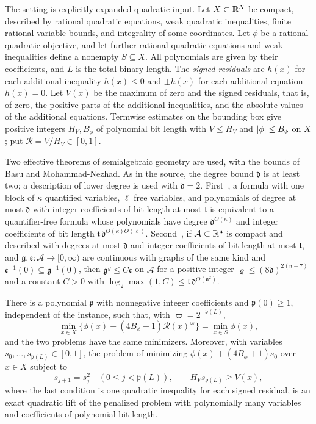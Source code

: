 The setting is explicitly expanded quadratic input. Let $X\subset\mathbb R^N$ be
compact, described by rational quadratic equations, weak quadratic
inequalities, finite rational variable bounds, and integrality of some
coordinates. Let $\phi$ be a rational quadratic objective, and let further
rational quadratic equations and weak inequalities define a nonempty
$S\subseteq X$. All polynomials are given by their coefficients, and $L$ is
the total binary length. The \emph{signed residuals} are $h(x)$ for each
additional inequality $h(x)\le0$ and $\pm h(x)$ for each additional equation
$h(x)=0$. Let $V(x)$ be the maximum of zero and the signed residuals, that
is, of zero, the positive parts of the additional inequalities, and the
absolute values of the additional equations. Termwise estimates on the
bounding box give positive
integers $H_V,B_\phi$ of polynomial bit length with $V\le H_V$ and
$\left\lvert\phi\right\rvert\le B_\phi$ on $X$; put $\mathcal R=V/H_V\in[0,1]$.

Two effective theorems of semialgebraic geometry are used, with the bounds
of Basu and Mohammad-Nezhad. As in the source, the degree bound $\mathfrak d$
is at least two; a description of lower degree is used with $\mathfrak d=2$.
First~\cite[Theorem~4.1]{BasuMohammadNezhad2024}, a formula with one block of
$\kappa$ quantified variables, $\ell$ free variables, and polynomials of
degree at most $\mathfrak d$ with integer coefficients of bit length at most
$\mathfrak t$ is equivalent to a quantifier-free formula whose polynomials
have degree $\mathfrak d^{O(\kappa)}$ and integer coefficients of bit length
$\mathfrak t\,\mathfrak d^{O(\kappa)O(\ell)}$.
Second~\cite[Theorem~2.2]{BasuMohammadNezhad2024}, if
$\mathcal A\subset\mathbb R^{\mathfrak n}$ is compact and described with degrees at
most $\mathfrak d$ and integer coefficients of bit length at most $\mathfrak t$,
and $\mathfrak g,\mathfrak e\colon\mathcal A\to[0,\infty)$ are continuous with
graphs of the same kind and $\mathfrak e^{-1}(0)\subseteq\mathfrak g^{-1}(0)$,
then $\mathfrak g^{\varrho}\le C\mathfrak e$ on $\mathcal A$ for a positive
integer $\varrho\le(8\mathfrak d)^{2(\mathfrak n+7)}$ and a constant $C>0$
with $\log_2\max(1,C)\le\mathfrak t\,\mathfrak d^{O(\mathfrak n^2)}$.

\begin{theorem}
\label{thm:bnd-root-penalty}
There is a polynomial $\mathfrak p$ with nonnegative integer coefficients and
$\mathfrak p(0)\ge1$, independent of the instance, such that, with
$\varpi=2^{-\mathfrak p(L)}$,
\[
\min_{x\in X}\bigl\{\phi(x)+(4B_\phi+1)\mathcal R(x)^{\varpi}\bigr\}
=\min_{x\in S}\phi(x),
\]
and the two problems have the same minimizers. Moreover, with variables
$s_0,\ldots,s_{\mathfrak p(L)}\in[0,1]$, the problem of minimizing
$\phi(x)+(4B_\phi+1)s_0$ over $x\in X$ subject to
\[
s_{j+1}=s_j^2\quad(0\le j<\mathfrak p(L)),\qquad
H_Vs_{\mathfrak p(L)}\ge V(x),
\]
where the last condition is one quadratic inequality for each signed
residual, is an exact quadratic lift of the penalized problem with
polynomially many variables and coefficients of polynomial bit length.
\end{theorem}

